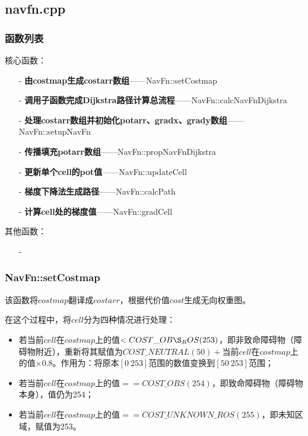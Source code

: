 \documentclass[9pt, oneside]{book}
\begin{document}
\subsection{navfn.cpp}

\subsubsection{函数列表}

核心函数：
\begin{itemize}
    \item [-] \textbf{由costmap生成costarr数组}——NavFn::setCostmap
    \item [-] \textbf{调用子函数完成Dijkstra路径计算总流程}——NavFn::calcNavFnDijkstra
    \item [-] \textbf{处理costarr数组并初始化potarr、gradx、grady数组}——NavFn::setupNavFn
    \item [-] \textbf{传播填充potarr数组}——NavFn::propNavFnDijkstra
    \item [-] \textbf{更新单个cell的pot值}——NavFn::updateCell
    \item [-] \textbf{梯度下降法生成路径}——NavFn::calcPath 
    \item [-] \textbf{计算cell处的梯度值}——NavFn::gradCell
\end{itemize}
    
其他函数：
\begin{itemize}
    \item [-] 
\end{itemize}

\subsubsection{NavFn::setCostmap}

该函数将$costmap$翻译成$costarr$，根据代价值$cost$生成无向权重图。

在这个过程中，将$cell$分为四种情况进行处理：
\begin{itemize}
    \item 若当前$cell$在$costmap$上的值$<COST\_OB\S_ROS(253)$，即非致命障碍物（障碍物附近），重新将其赋值为$COST\_NEUTRAL(50)+$当前$cell$在$costmap$上的值$×0.8$。作用为：将原本$[0~253]$范围的数值变换到$[50~253]$范围；
    \item 若当前$cell$在$costmap$上的值$== COST\_OBS(254)$，即致命障碍物（障碍物本身），值仍为254；
    \item 若当前$cell$在$costmap$上的值$== COST\_UNKNOWN\_ROS(255)$，即未知区域，赋值为253。
\end{itemize}
\end{document}
